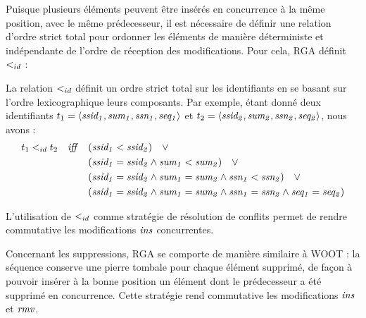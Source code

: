 Puisque plusieurs éléments peuvent être insérés en concurrence à la même position, \ie avec le même prédecesseur, il est nécessaire de définir une relation d'ordre strict total pour ordonner les éléments de manière déterministe et indépendante de l'ordre de réception des modifications.
Pour cela, \ac{RGA} définit $<_{id}$ :
\begin{definition}
  La relation $<_{id}$ définit un ordre strict total sur les identifiants en se basant sur l'ordre lexicographique leurs composants.
  Par exemple, étant donné deux identifiants $t_1 = \langle \mathit{ssid_1},\mathit{sum_1},\mathit{ssn_1},\mathit{seq_1} \rangle$ et $t_2 = \langle \mathit{ssid_2},\mathit{sum_2},\mathit{ssn_2},\mathit{seq_2} \rangle$, nous avons :
  \begin{equation*}
    \begin{split}
      t_1 <_{id} t_2 \quad \mathit{iff} \quad  & (\mathit{ssid_1} < \mathit{ssid_2}) \quad \lor \\
                                            & (\mathit{ssid_1} = \mathit{ssid_2} \land \mathit{sum_1} < \mathit{sum_2}) \quad \lor \\
                                            & (\mathit{ssid_1} = \mathit{ssid_2} \land \mathit{sum_1} = \mathit{sum_2} \land \mathit{ssn_1} < \mathit{ssn_2}) \quad \lor \\
                                            & (\mathit{ssid_1} = \mathit{ssid_2} \land \mathit{sum_1} = \mathit{sum_2} \land \mathit{ssn_1} = \mathit{ssn_2} \land \mathit{seq_1} = \mathit{seq_2}) \\
    \end{split}
  \end{equation*}
\end{definition}
L'utilisation de $<_{id}$ comme stratégie de résolution de conflits permet de rendre commutative les modifications $\mathit{ins}$ concurrentes.

Concernant les suppressions, \ac{RGA} se comporte de manière similaire à WOOT : la séquence conserve une pierre tombale pour chaque élément supprimé, de façon à pouvoir insérer à la bonne position un élément dont le prédecesseur a été supprimé en concurrence.
Cette stratégie rend commutative les modifications $\mathit{ins}$ et $\mathit{rmv}$.

